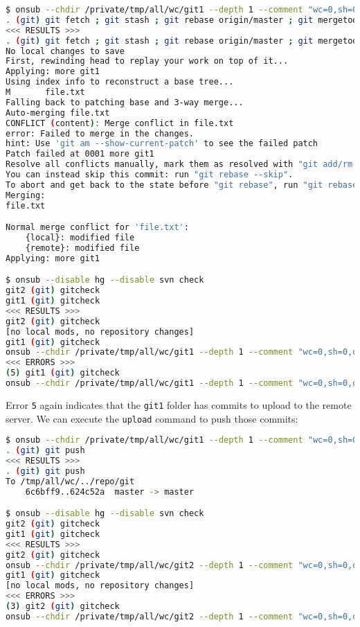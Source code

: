 \begin{snugshade}
\begin{lstlisting}[language=bash]	
$ onsub --chdir /private/tmp/all/wc/git1 --depth 1 --comment "wc=0,sh=0,out=1,in=2" {download}
. (git) git fetch ; git stash ; git rebase origin/master ; git mergetool -y --tool=kdiff3 ; git rebase --continue
<<< RESULTS >>>
. (git) git fetch ; git stash ; git rebase origin/master ; git mergetool -y --tool=kdiff3 ; git rebase --continue
No local changes to save
First, rewinding head to replay your work on top of it...
Applying: more git1
Using index info to reconstruct a base tree...
M       file.txt
Falling back to patching base and 3-way merge...
Auto-merging file.txt
CONFLICT (content): Merge conflict in file.txt
error: Failed to merge in the changes.
hint: Use 'git am --show-current-patch' to see the failed patch
Patch failed at 0001 more git1
Resolve all conflicts manually, mark them as resolved with "git add/rm <conflicted_files>", then run "git rebase --continue".
You can instead skip this commit: run "git rebase --skip".
To abort and get back to the state before "git rebase", run "git rebase --abort".
Merging:
file.txt

Normal merge conflict for 'file.txt':
	{local}: modified file
	{remote}: modified file
Applying: more git1

$ onsub --disable hg --disable svn check
git2 (git) gitcheck
git1 (git) gitcheck
<<< RESULTS >>>
git2 (git) gitcheck
[no local mods, no repository changes]
git1 (git) gitcheck
onsub --chdir /private/tmp/all/wc/git1 --depth 1 --comment "wc=0,sh=0,out=1,in=0" {upload}
<<< ERRORS >>>
(5) git1 (git) gitcheck
onsub --chdir /private/tmp/all/wc/git1 --depth 1 --comment "wc=0,sh=0,out=1,in=0" {upload}
\end{lstlisting}
\end{snugshade}

Error \lstinline{5} again indicates that the \lstinline{git1} folder has commits to upload to the remote server. We can execute the \lstinline{upload} command to push those commits:

\begin{snugshade}
\begin{lstlisting}[language=bash]	
$ onsub --chdir /private/tmp/all/wc/git1 --depth 1 --comment "wc=0,sh=0,out=1,in=0" {upload}
. (git) git push
<<< RESULTS >>>
. (git) git push
To /tmp/all/wc/../repo/git
	6c6bff9..624c52a  master -> master

$ onsub --disable hg --disable svn check
git2 (git) gitcheck
git1 (git) gitcheck
<<< RESULTS >>>
git2 (git) gitcheck
onsub --chdir /private/tmp/all/wc/git2 --depth 1 --comment "wc=0,sh=0,out=0,in=1" {get}
git1 (git) gitcheck
[no local mods, no repository changes]
<<< ERRORS >>>
(3) git2 (git) gitcheck
onsub --chdir /private/tmp/all/wc/git2 --depth 1 --comment "wc=0,sh=0,out=0,in=1" {get}
\end{lstlisting}
\end{snugshade}


